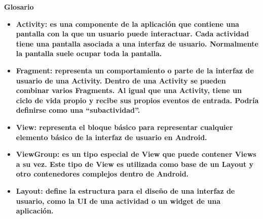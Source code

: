 \huge \textbf{Glosario}
\normalsize
\begin{itemize}
	\item \textbf{Activity: es una componente de la aplicación que contiene una pantalla con la que un usuario puede interactuar. Cada actividad tiene una pantalla asociada a una interfaz de usuario. Normalmente la pantalla suele ocupar toda la pantalla.}
	\item \textbf{Fragment: representa un comportamiento o parte de la interfaz de usuario de una Activity. Dentro de una Activity se pueden combinar varios Fragments. Al igual que una Activity, tiene un ciclo de vida propio y recibe sus propios eventos de entrada. Podría definirse como una \enquote{subactividad}.}
	\item \textbf{View: representa el bloque básico para representar cualquier elemento básico de la interfaz de usuario en Android.}
	\item \textbf{ViewGroup: es un tipo especial de View que puede contener Views a su vez. Este tipo de View es utilizada como base de un Layout y otro contenedores complejos dentro de Android.}
	\item \textbf{Layout: define la estructura para el diseño de una interfaz de usuario, como la UI de una actividad o un widget de una aplicación.}
\end{itemize}

